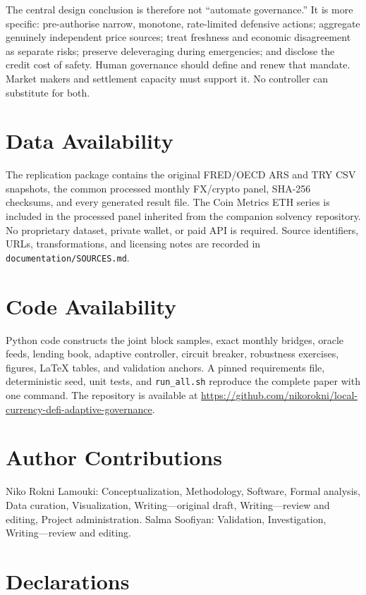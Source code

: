 \documentclass[sn-vancouver,Numbered]{sn-jnl}
\begin{document}
The central design conclusion is therefore not ``automate governance.'' It is more specific: pre-authorise narrow, monotone, rate-limited defensive actions; aggregate genuinely independent price sources; treat freshness and economic disagreement as separate risks; preserve deleveraging during emergencies; and disclose the credit cost of safety. Human governance should define and renew that mandate. Market makers and settlement capacity must support it. No controller can substitute for both.

\section*{Data Availability}

The replication package contains the original FRED/OECD ARS and TRY CSV snapshots, the common processed monthly FX/crypto panel, SHA-256 checksums, and every generated result file. The Coin Metrics ETH series is included in the processed panel inherited from the companion solvency repository. No proprietary dataset, private wallet, or paid API is required. Source identifiers, URLs, transformations, and licensing notes are recorded in \texttt{documentation/SOURCES.md}.

\section*{Code Availability}

Python code constructs the joint block samples, exact monthly bridges, oracle feeds, lending book, adaptive controller, circuit breaker, robustness exercises, figures, LaTeX tables, and validation anchors. A pinned requirements file, deterministic seed, unit tests, and \texttt{run\_all.sh} reproduce the complete paper with one command. The repository is available at \url{https://github.com/nikorokni/local-currency-defi-adaptive-governance}.

\section*{Author Contributions}

Niko Rokni Lamouki: Conceptualization, Methodology, Software, Formal analysis, Data curation, Visualization, Writing---original draft, Writing---review and editing, Project administration. Salma Soofiyan: Validation, Investigation, Writing---review and editing.

\section*{Declarations}
\end{document}
